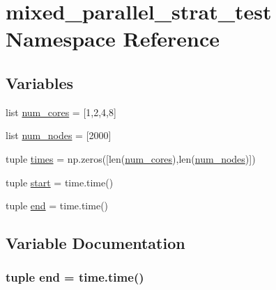 \hypertarget{namespacemixed__parallel__strat__test}{\section{mixed\-\_\-parallel\-\_\-strat\-\_\-test Namespace Reference}
\label{namespacemixed__parallel__strat__test}
}
\subsection*{Variables}
\begin{DoxyCompactItemize}
\item 
list \hyperlink{namespacemixed__parallel__strat__test_a2aef08ba119878974b70d51fca7b65bd}{num\-\_\-cores} = \mbox{[}1,2,4,8\mbox{]}
\item 
list \hyperlink{namespacemixed__parallel__strat__test_aa960f02b9f7f22de9e3fbe916ffe62ac}{num\-\_\-nodes} = \mbox{[}2000\mbox{]}
\item 
tuple \hyperlink{namespacemixed__parallel__strat__test_a7a4cdc1f55476e6705c9c39b53d8ecb9}{times} = np.\-zeros(\mbox{[}len(\hyperlink{namespacemixed__parallel__strat__test_a2aef08ba119878974b70d51fca7b65bd}{num\-\_\-cores}),len(\hyperlink{namespacemixed__parallel__strat__test_aa960f02b9f7f22de9e3fbe916ffe62ac}{num\-\_\-nodes})\mbox{]})
\item 
tuple \hyperlink{namespacemixed__parallel__strat__test_ac19c5d7b91bdfde51f8a7f0614c6e424}{start} = time.\-time()
\item 
tuple \hyperlink{namespacemixed__parallel__strat__test_a57e3a39358610bc8ca2a9456b15d8085}{end} = time.\-time()
\end{DoxyCompactItemize}


\subsection{Variable Documentation}
\hypertarget{namespacemixed__parallel__strat__test_a57e3a39358610bc8ca2a9456b15d8085}{
\subsubsection[{end}]{\setlength{\rightskip}{0pt plus 5cm}tuple end = time.\-time()}}\label{namespacemixed__parallel__strat__test_a57e3a39358610bc8ca2a9456b15d8085}



